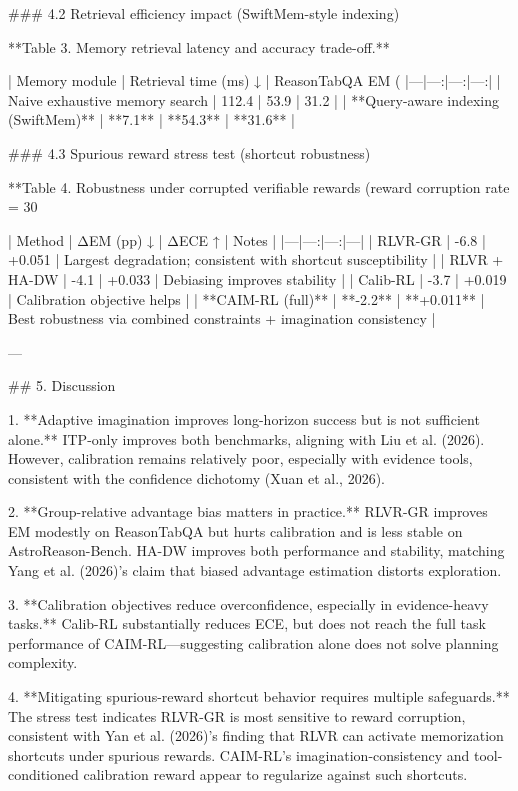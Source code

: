 ### 4.2 Retrieval efficiency impact (SwiftMem-style indexing)  

**Table 3. Memory retrieval latency and accuracy trade-off.**

| Memory module | Retrieval time (ms) ↓ | ReasonTabQA EM (%
|---|---:|---:|---:|
| Naive exhaustive memory search | 112.4 | 53.9 | 31.2 |
| **Query-aware indexing (SwiftMem)** | **7.1** | **54.3** | **31.6** |

### 4.3 Spurious reward stress test (shortcut robustness)  

**Table 4. Robustness under corrupted verifiable rewards (reward corruption rate = 30%

| Method | ΔEM (pp) ↓ | ΔECE ↑ | Notes |
|---|---:|---:|---|
| RLVR-GR | -6.8 | +0.051 | Largest degradation; consistent with shortcut susceptibility |
| RLVR + HA-DW | -4.1 | +0.033 | Debiasing improves stability |
| Calib-RL | -3.7 | +0.019 | Calibration objective helps |
| **CAIM-RL (full)** | **-2.2** | **+0.011** | Best robustness via combined constraints + imagination consistency |

---

## 5. Discussion  

1. **Adaptive imagination improves long-horizon success but is not sufficient alone.**  
   ITP-only improves both benchmarks, aligning with Liu et al. (2026). However, calibration remains relatively poor, especially with evidence tools, consistent with the confidence dichotomy (Xuan et al., 2026).

2. **Group-relative advantage bias matters in practice.**  
   RLVR-GR improves EM modestly on ReasonTabQA but hurts calibration and is less stable on AstroReason-Bench. HA-DW improves both performance and stability, matching Yang et al. (2026)’s claim that biased advantage estimation distorts exploration.

3. **Calibration objectives reduce overconfidence, especially in evidence-heavy tasks.**  
   Calib-RL substantially reduces ECE, but does not reach the full task performance of CAIM-RL—suggesting calibration alone does not solve planning complexity.

4. **Mitigating spurious-reward shortcut behavior requires multiple safeguards.**  
   The stress test indicates RLVR-GR is most sensitive to reward corruption, consistent with Yan et al. (2026)’s finding that RLVR can activate memorization shortcuts under spurious rewards. CAIM-RL’s imagination-consistency and tool-conditioned calibration reward appear to regularize against such shortcuts.


